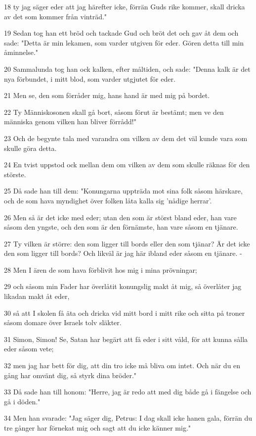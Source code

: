 \par 18 ty jag säger eder att jag härefter icke, förrän Guds rike kommer, skall dricka av det som kommer från vinträd."
\par 19 Sedan tog han ett bröd och tackade Gud och bröt det och gav åt dem och sade: "Detta är min lekamen, som varder utgiven för eder. Gören detta till min åminnelse."
\par 20 Sammalunda tog han ock kalken, efter måltiden, och sade: "Denna kalk är det nya förbundet, i mitt blod, som varder utgjutet för eder.
\par 21 Men se, den som förråder mig, hans hand är med mig på bordet.
\par 22 Ty Människosonen skall gå bort, såsom förut är bestämt; men ve den människa genom vilken han bliver förrådd!"
\par 23 Och de begynte tala med varandra om vilken av dem det väl kunde vara som skulle göra detta.
\par 24 En tvist uppstod ock mellan dem om vilken av dem som skulle räknas för den störste.
\par 25 Då sade han till dem: "Konungarna uppträda mot sina folk såsom härskare, och de som hava myndighet över folken låta kalla sig 'nådige herrar'.
\par 26 Men så är det icke med eder; utan den som är störst bland eder, han vare såsom den yngste, och den som är den förnämste, han vare såsom en tjänare.
\par 27 Ty vilken är större: den som ligger till bords eller den som tjänar? Är det icke den som ligger till bords? Och likväl är jag här ibland eder såsom en tjänare. -
\par 28 Men I ären de som hava förblivit hos mig i mina prövningar;
\par 29 och såsom min Fader har överlåtit konungslig makt åt mig, så överlåter jag likadan makt åt eder,
\par 30 så att I skolen få äta och dricka vid mitt bord i mitt rike och sitta på troner såsom domare över Israels tolv släkter.
\par 31 Simon, Simon! Se, Satan har begärt att få eder i sitt våld, för att kunna sålla eder såsom vete;
\par 32 men jag har bett för dig, att din tro icke må bliva om intet. Och när du en gång har omvänt dig, så styrk dina bröder."
\par 33 Då sade han till honom: "Herre, jag är redo att med dig både gå i fängelse och gå i döden."
\par 34 Men han svarade: "Jag säger dig, Petrus: I dag skall icke hanen gala, förrän du tre gånger har förnekat mig och sagt att du icke känner mig."
